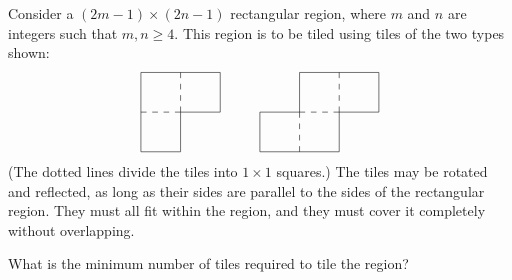 Consider a $(2m-1) \times (2n-1)$ rectangular region, where $m$ and $n$ are integers such that $m, n \geq 4$. This region is to be tiled using tiles of the two types shown:
\[
\setlength{\unitlength}{4144sp}%
%
\begingroup\makeatletter\ifx\SetFigFont\undefined%
\gdef\SetFigFont#1#2#3#4#5{%
  \reset@font\fontsize{#1}{#2pt}%
  \fontfamily{#3}\fontseries{#4}\fontshape{#5}%
  \selectfont}%
\fi\endgroup%
\begin{picture}(2724,924)(1339,-1423)
\thinlines
{\put(1351,-511){\line( 0,-1){900}}
\put(1351,-1411){\line( 1, 0){450}}
\put(1801,-1411){\line( 0, 1){450}}
\put(1801,-961){\line( 1, 0){450}}
\put(2251,-961){\line( 0, 1){450}}
\put(2251,-511){\line(-1, 0){900}}
}%
{\multiput(1351,-961)(128.57143,0.00000){4}{\line( 1, 0){ 64.286}}
\multiput(1801,-961)(0.00000,128.57143){4}{\line( 0, 1){ 64.286}}
}%
{\put(2701,-961){\line( 0,-1){450}}
\put(2701,-1411){\line( 1, 0){900}}
\put(3601,-1411){\line( 0, 1){450}}
\put(3601,-961){\line( 1, 0){450}}
\put(4051,-961){\line( 0, 1){450}}
\put(4051,-511){\line(-1, 0){900}}
\put(3151,-511){\line( 0,-1){450}}
\put(3151,-961){\line(-1, 0){450}}
}%
{\multiput(3151,-1411)(0.00000,128.57143){4}{\line( 0, 1){ 64.286}}
\multiput(3151,-961)(128.57143,0.00000){4}{\line( 1, 0){ 64.286}}
\multiput(3601,-961)(0.00000,128.57143){4}{\line( 0, 1){ 64.286}}
}%
\end{picture}%
\]
(The dotted lines divide the tiles into $1 \times 1$ squares.)
The tiles may be rotated and reflected, as long as their sides are parallel to the sides
of the rectangular region. They must all fit within the region, and they must cover it completely without overlapping.

What is the minimum number of tiles required to tile the region?

